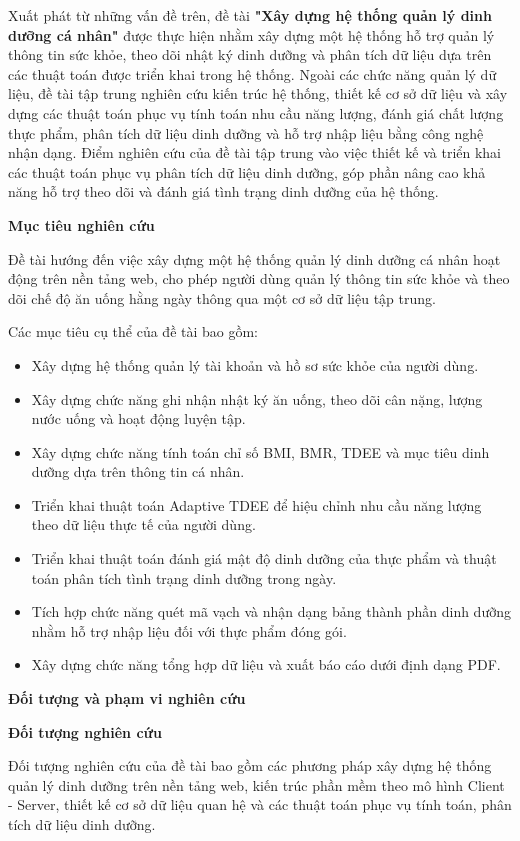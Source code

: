 \documentclass[12pt, a4paper]{report}
\begin{document}
Xuất phát từ những vấn đề trên, đề tài \textbf{"Xây dựng hệ thống quản lý dinh dưỡng cá nhân"} được thực hiện nhằm xây dựng một hệ thống hỗ trợ quản lý thông tin sức khỏe, theo dõi nhật ký dinh dưỡng và phân tích dữ liệu dựa trên các thuật toán được triển khai trong hệ thống. Ngoài các chức năng quản lý dữ liệu, đề tài tập trung nghiên cứu kiến trúc hệ thống, thiết kế cơ sở dữ liệu và xây dựng các thuật toán phục vụ tính toán nhu cầu năng lượng, đánh giá chất lượng thực phẩm, phân tích dữ liệu dinh dưỡng và hỗ trợ nhập liệu bằng công nghệ nhận dạng. Điểm nghiên cứu của đề tài tập trung vào việc thiết kế và triển khai các thuật toán phục vụ phân tích dữ liệu dinh dưỡng, góp phần nâng cao khả năng hỗ trợ theo dõi và đánh giá tình trạng dinh dưỡng của hệ thống.

\textbf{Mục tiêu nghiên cứu}

Đề tài hướng đến việc xây dựng một hệ thống quản lý dinh dưỡng cá nhân hoạt động trên nền tảng web, cho phép người dùng quản lý thông tin sức khỏe và theo dõi chế độ ăn uống hằng ngày thông qua một cơ sở dữ liệu tập trung.

Các mục tiêu cụ thể của đề tài bao gồm:

\begin{itemize}
\item Xây dựng hệ thống quản lý tài khoản và hồ sơ sức khỏe của người dùng.
\item Xây dựng chức năng ghi nhận nhật ký ăn uống, theo dõi cân nặng, lượng nước uống và hoạt động luyện tập.
\item Xây dựng chức năng tính toán chỉ số BMI, BMR, TDEE và mục tiêu dinh dưỡng dựa trên thông tin cá nhân.
\item Triển khai thuật toán Adaptive TDEE để hiệu chỉnh nhu cầu năng lượng theo dữ liệu thực tế của người dùng.
\item Triển khai thuật toán đánh giá mật độ dinh dưỡng của thực phẩm và thuật toán phân tích tình trạng dinh dưỡng trong ngày.
\item Tích hợp chức năng quét mã vạch và nhận dạng bảng thành phần dinh dưỡng nhằm hỗ trợ nhập liệu đối với thực phẩm đóng gói.
\item Xây dựng chức năng tổng hợp dữ liệu và xuất báo cáo dưới định dạng PDF.
\end{itemize}
\textbf{Đối tượng và phạm vi nghiên cứu}

\textbf{Đối tượng nghiên cứu}

Đối tượng nghiên cứu của đề tài bao gồm các phương pháp xây dựng hệ thống quản lý dinh dưỡng trên nền tảng web, kiến trúc phần mềm theo mô hình Client - Server, thiết kế cơ sở dữ liệu quan hệ và các thuật toán phục vụ tính toán, phân tích dữ liệu dinh dưỡng.
\end{document}
